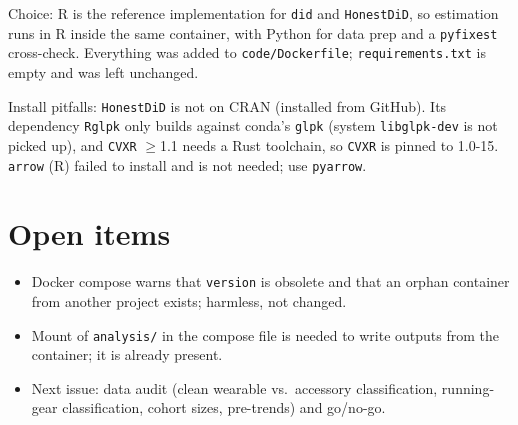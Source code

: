 \documentclass[11pt]{article}
\begin{document}
\noindent Choice: R is the reference implementation for \texttt{did} and \texttt{HonestDiD}, so estimation runs in R inside the
same container, with Python for data prep and a \texttt{pyfixest} cross-check. Everything was added to \texttt{code/Dockerfile};
\texttt{requirements.txt} is empty and was left unchanged.

\noindent Install pitfalls: \texttt{HonestDiD} is not on CRAN (installed from GitHub). Its dependency \texttt{Rglpk} only builds
against conda's \texttt{glpk} (system \texttt{libglpk-dev} is not picked up), and \texttt{CVXR} $\geq$1.1 needs a Rust toolchain,
so \texttt{CVXR} is pinned to 1.0-15. \texttt{arrow} (R) failed to install and is not needed; use \texttt{pyarrow}.

\section{Open items}
\begin{itemize}[nosep]
  \item Docker compose warns that \texttt{version} is obsolete and that an orphan container from another project exists; harmless, not changed.
  \item Mount of \texttt{analysis/} in the compose file is needed to write outputs from the container; it is already present.
  \item Next issue: data audit (clean wearable vs.\ accessory classification, running-gear classification, cohort sizes, pre-trends) and go/no-go.
\end{itemize}
\end{document}

